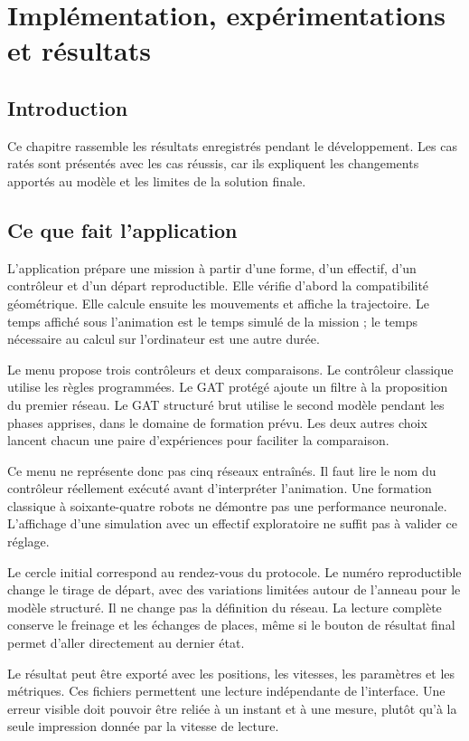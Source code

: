 \chapter{Implémentation, expérimentations et résultats}
\label{chap:experiences}

\section{Introduction}
Ce chapitre rassemble les résultats enregistrés pendant le développement. Les cas ratés sont présentés avec les cas réussis, car ils expliquent les changements apportés au modèle et les limites de la solution finale.


\section{Ce que fait l'application}
L'application prépare une mission à partir d'une forme, d'un effectif, d'un contrôleur et d'un départ reproductible. Elle vérifie d'abord la compatibilité géométrique. Elle calcule ensuite les mouvements et affiche la trajectoire. Le temps affiché sous l'animation est le temps simulé de la mission ; le temps nécessaire au calcul sur l'ordinateur est une autre durée.

Le menu propose trois contrôleurs et deux comparaisons. Le contrôleur classique utilise les règles programmées. Le GAT protégé ajoute un filtre à la proposition du premier réseau. Le GAT structuré brut utilise le second modèle pendant les phases apprises, dans le domaine de formation prévu. Les deux autres choix lancent chacun une paire d'expériences pour faciliter la comparaison.

Ce menu ne représente donc pas cinq réseaux entraînés. Il faut lire le nom du contrôleur réellement exécuté avant d'interpréter l'animation. Une formation classique à soixante-quatre robots ne démontre pas une performance neuronale. L'affichage d'une simulation avec un effectif exploratoire ne suffit pas à valider ce réglage.

Le cercle initial correspond au rendez-vous du protocole. Le numéro reproductible change le tirage de départ, avec des variations limitées autour de l'anneau pour le modèle structuré. Il ne change pas la définition du réseau. La lecture complète conserve le freinage et les échanges de places, même si le bouton de résultat final permet d'aller directement au dernier état.

Le résultat peut être exporté avec les positions, les vitesses, les paramètres et les métriques. Ces fichiers permettent une lecture indépendante de l'interface. Une erreur visible doit pouvoir être reliée à un instant et à une mesure, plutôt qu'à la seule impression donnée par la vitesse de lecture.

